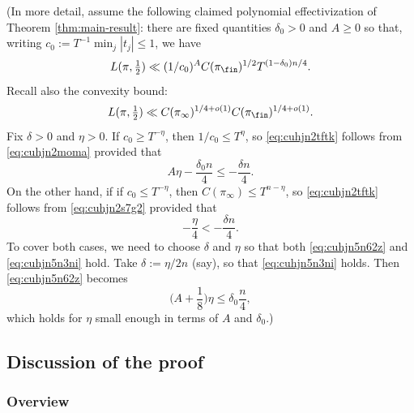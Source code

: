 \begin{remark}
  (In more detail, assume the following claimed polynomial effectivization of Theorem \ref{thm:main-result}: there are fixed quantities $\delta_0 > 0$ and $A \geq 0$ so that, writing $c_0 := T^{-1} \min_j |t_j| \leq 1$, we have
  \begin{equation}\label{eq:cuhjn2moma}
    L(\pi, \tfrac{1}{2})  \ll(1 / c_0)^{A} C(\pi_{\fin})^{1/2} T^{(1-\delta_0)n/4}.
  \end{equation}
  Recall also the convexity bound:
  \begin{equation}\label{eq:cuhjn2s7g2}
    L(\pi, \tfrac{1}{2}) \ll C(\pi_\infty)^{1/4 + o(1)} C(\pi_{\fin})^{1/4 + o(1)}.
  \end{equation}
  Fix $\delta > 0$ and $\eta > 0$.  If $c_0 \geq T^{- \eta}$, then $1 / c_0 \leq T^{\eta}$, so \eqref{eq:cuhjn2tftk} follows from \eqref{eq:cuhjn2moma} provided that
  \begin{equation}\label{eq:cuhjn5n62z}
    A \eta - \frac{\delta_0 n}{4} \leq - \frac{\delta n}{4}.
  \end{equation}
  On the other hand, if if $c_0 \leq T^{- \eta}$, then $C(\pi_\infty) \leq T^{n - \eta}$, so \eqref{eq:cuhjn2tftk} follows from \eqref{eq:cuhjn2s7g2} provided that
  \begin{equation}\label{eq:cuhjn5n3ni}
    -\frac{\eta}{4} < - \frac{\delta n}{4}.
  \end{equation}
  To cover both cases, we need to choose $\delta$ and $\eta$ so that both \eqref{eq:cuhjn5n62z} and \eqref{eq:cuhjn5n3ni} hold.  Take $\delta := \eta / 2 n$ (say), so that \eqref{eq:cuhjn5n3ni} holds.  Then \eqref{eq:cuhjn5n62z} becomes
  \begin{equation*}
    \biggl(A + \frac{1}{8}\biggr) \eta \leq \delta_0 \frac{n}{4},
  \end{equation*}
  which holds for $\eta$ small enough in terms of $A$ and $\delta_0$.)
\end{remark}





\subsection{Discussion of the proof}\label{sec:high-level-overview}

\subsubsection{Overview}

